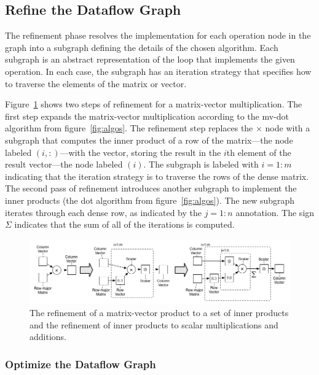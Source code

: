 \documentclass[11pt]{article}
\begin{document}
\subsection{Refine the Dataflow Graph}
\label{sec:refine}

The refinement phase resolves the implementation for each operation node in the graph into a subgraph defining the details of the chosen algorithm.  Each subgraph is an abstract representation of the loop that implements the given operation.  In each case, the subgraph has an iteration strategy that specifies how to traverse the elements of the matrix or vector.

Figure~\ref{fig:refine-mv-dot} shows two steps of refinement for a matrix-vector multiplication. The first step expands the matrix-vector multiplication according to the mv-dot algorithm from figure~\ref{fig:algos}.  The refinement step replaces the $\times$ node with a subgraph that computes the inner product of a row of the matrix---the node labeled $(i,:)$---with the vector, storing the result in the $i$th element of the result vector---the node labeled $(i)$. The subgraph is labeled with $i=1\!:\!m$ indicating that the iteration strategy is to traverse the rows of the dense matrix.
%
The second pass of refinement introduces another subgraph to implement the inner products (the dot algorithm from figure~\ref{fig:algos}). The new subgraph iterates through each dense row, as indicated by the $j=1:n$ annotation. The sign $\Sigma$ indicates that the sum of all of the iterations is computed.


\begin{figure}[hbtp]
  \centering
  \includegraphics[width=\textwidth]{figures/refine-mv-dot.png}

  \caption{The refinement of a matrix-vector product to a set of inner products and the refinement of inner products to scalar multiplications and additions.}
  \label{fig:refine-mv-dot}
\end{figure}




\subsubsection{Optimize the Dataflow Graph}
\end{document}
